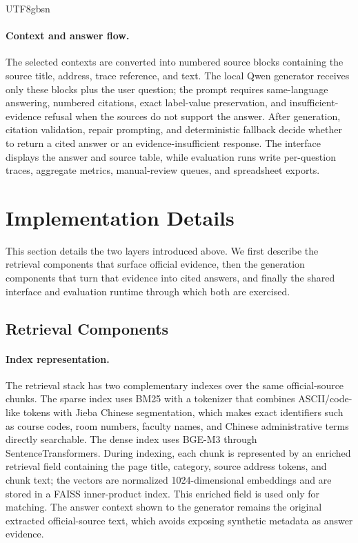 \documentclass{article}
\begin{document}
\begin{CJK*}{UTF8}{gbsn}
\paragraph{Context and answer flow.}
The selected contexts are converted into numbered source blocks containing the source title, address, trace reference, and text. The local Qwen generator receives only these blocks plus the user question; the prompt requires same-language answering, numbered citations, exact label-value preservation, and insufficient-evidence refusal when the sources do not support the answer. After generation, citation validation, repair prompting, and deterministic fallback decide whether to return a cited answer or an evidence-insufficient response. The interface displays the answer and source table, while evaluation runs write per-question traces, aggregate metrics, manual-review queues, and spreadsheet exports.

\section{Implementation Details}

This section details the two layers introduced above. We first describe the retrieval components that surface official evidence, then the generation components that turn that evidence into cited answers, and finally the shared interface and evaluation runtime through which both are exercised.

\subsection{Retrieval Components}

\paragraph{Index representation.}
The retrieval stack has two complementary indexes over the same official-source chunks. The sparse index uses BM25 with a tokenizer that combines ASCII/code-like tokens with Jieba Chinese segmentation, which makes exact identifiers such as course codes, room numbers, faculty names, and Chinese administrative terms directly searchable. The dense index uses BGE-M3 through SentenceTransformers. During indexing, each chunk is represented by an enriched retrieval field containing the page title, category, source address tokens, and chunk text; the vectors are normalized 1024-dimensional embeddings and are stored in a FAISS inner-product index. This enriched field is used only for matching. The answer context shown to the generator remains the original extracted official-source text, which avoids exposing synthetic metadata as answer evidence.


\end{CJK*}
\end{document}
